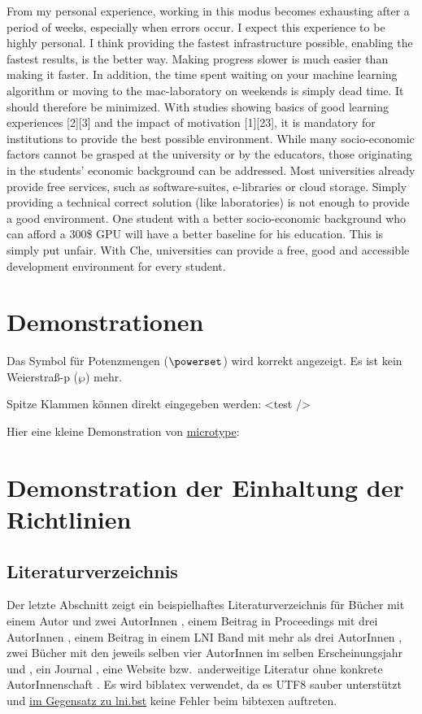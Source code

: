 \documentclass[utf8,biblatex]{lni}
\begin{document}
From my personal experience, working in this modus becomes exhausting after a period of weeks, especially when errors occur. 
I expect this experience to be highly personal. 
I think providing the fastest infrastructure possible, enabling the fastest results, is the better way. 
Making progress slower is much easier than making it faster.  
In addition, the time spent waiting on your machine learning algorithm or moving to the mac-laboratory on weekends is simply dead time. 
It should therefore be minimized.   
With studies showing basics of good learning experiences [2][3] and the impact of motivation [1][23], it is mandatory for institutions to provide the best possible environment. 
While many socio-economic factors cannot be grasped at the university or by the educators, those originating in the students' economic background can be addressed.
Most universities already provide free services, such as software-suites, e-libraries or cloud storage.
Simply providing a technical correct solution (like laboratories) is not enough to provide a good environment.
One student with a better socio-economic background who can afford a 300\$ GPU will have a better baseline for his education. 
This is simply put unfair.
With Che, universities can provide a free, good and accessible development environment for every student.

\section{Demonstrationen}
\label{sec:demos}
Das Symbol für Potenzmengen ($\powerset$) wird korrekt angezeigt.
Es ist kein Weierstraß-p ($\wp$) mehr.

Spitze Klammen können direkt eingegeben werden: <test />

Hier eine kleine Demonstration von \href{https://www.ctan.org/pkg/microtype}{microtype}:
\blindtext

\section{Demonstration der Einhaltung der Richtlinien}
\label{sec:lniconformance}

\subsection{Literaturverzeichnis}
Der letzte Abschnitt zeigt ein beispielhaftes Literaturverzeichnis für Bücher mit einem Autor \cite{Ez10} und zwei AutorInnen \cite{AB00}, einem Beitrag in Proceedings mit drei AutorInnen \cite{ABC01}, einem Beitrag in einem LNI Band mit mehr als drei AutorInnen \cite{Az09}, zwei Bücher mit den jeweils selben vier AutorInnen im selben Erscheinungsjahr \cite{Wa14} und \cite{Wa14b}, ein Journal \cite{Gl06}, eine Website \cite{GI19} bzw.\ anderweitige Literatur ohne konkrete AutorInnenschaft \cite{XX14}.
Es wird biblatex verwendet, da es UTF8 sauber unterstützt und \href{https://github.com/gi-ev/LNI/issues/5}{im Gegensatz zu lni.bst} keine Fehler beim bibtexen auftreten.
\end{document}
